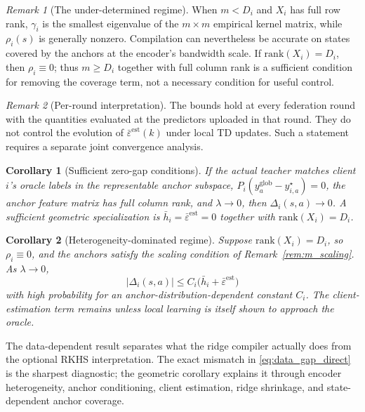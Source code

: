 \documentclass[sigconf,anonymous]{aamas}
\theoremstyle{plain}
\newtheorem{corollary}{Corollary}
\theoremstyle{definition}
\theoremstyle{remark}
\newtheorem{remark}{Remark}
\begin{document}
\begin{remark}[The under-determined regime]
\label{rem:underdetermined}
When $m<D_i$ and $X_i$ has full row rank, $\gamma_i$ is the smallest
eigenvalue of the $m\times m$ empirical kernel matrix, while
$\rho_i(s)$ is generally nonzero.  Compilation can nevertheless be
accurate on states covered by the anchors at the encoder's bandwidth
scale.  If $\mathrm{rank}(X_i)=D_i$, then $\rho_i\equiv0$; thus
$m\ge D_i$ together with full column rank is a sufficient condition for
removing the coverage term, not a necessary condition for useful control.
\end{remark}

\begin{remark}[Per-round interpretation]
\label{rem:per_round}
The bounds hold at every federation round with the quantities evaluated
at the predictors uploaded in that round.  They do not control the
evolution of $\bar\varepsilon^{\mathrm{est}}(k)$ under local TD updates.
Such a statement requires a separate joint convergence analysis.
\end{remark}

\begin{corollary}[Sufficient zero-gap conditions]
If the actual teacher matches client $i$'s oracle labels in the
representable anchor subspace,
$P_i(y^{\mathrm{glob}}_a-y^\star_{i,a})=0$, the anchor feature matrix has
full column rank, and $\lambda\to0$, then
$\Delta_i(s,a)\to0$.  A sufficient geometric specialization is
$\bar h_i=\bar\varepsilon^{\mathrm{est}}=0$ together with
$\mathrm{rank}(X_i)=D_i$.
\end{corollary}

\begin{corollary}[Heterogeneity-dominated regime]
\label{col:phase_transition}
Suppose $\mathrm{rank}(X_i)=D_i$, so $\rho_i\equiv0$, and the anchors
satisfy the scaling condition of Remark~\ref{rem:m_scaling}.  As
$\lambda\to0$,
\[
|\Delta_i(s,a)|
\le
C_i\bigl(\bar h_i+\bar\varepsilon^{\mathrm{est}}\bigr)
\]
with high probability for an anchor-distribution-dependent constant
$C_i$.  The client-estimation term remains unless local learning is
itself shown to approach the oracle.
\end{corollary}

The data-dependent result separates what the ridge compiler actually
does from the optional RKHS interpretation.  The exact mismatch in
\eqref{eq:data_gap_direct} is the sharpest diagnostic; the geometric
corollary explains it through encoder heterogeneity, anchor
conditioning, client estimation, ridge shrinkage, and state-dependent
anchor coverage.
\end{document}
